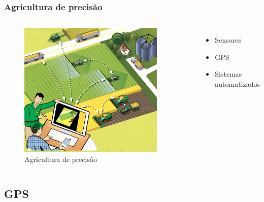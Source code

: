 \begin{frame}
\frametitle{Agricultura de precisão}
\begin{columns}

	\begin{figure}[]
	 \centering
	 \captionsetup{width=0.9\textwidth,font=footnotesize,textfont=bf}
	 \includegraphics[width=0.9\textwidth,keepaspectratio]{Figuras/precisao.jpg}
	 \caption{Agricultura de precisão}
	\end{figure}
	
	\begin{itemize}
	\item Sensores
	\item GPS
	\item Sistemas automatizados
	\end{itemize}

\end{columns}

\end{frame}

\subsection{GPS}

